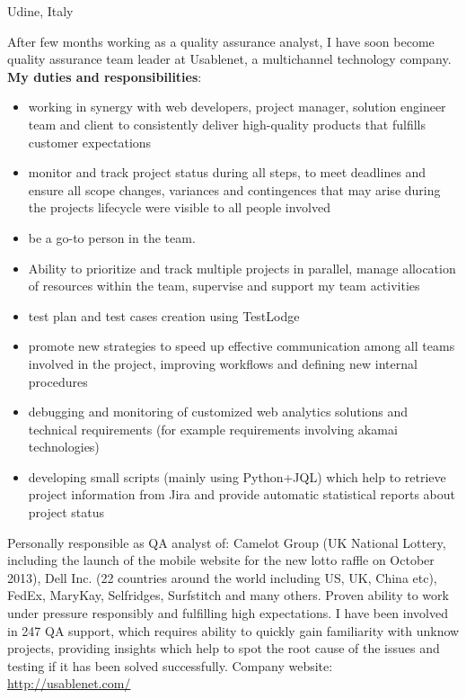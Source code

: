 \documentclass[10pt,a4paper]{moderncv}   %
\begin{document}
   {Udine, Italy}{}{After few months working as a quality assurance analyst, I
      have soon become
   quality assurance team leader at Usablenet, a multichannel technology
   company. 
   \\
   \textbf{My duties and responsibilities}:
   \begin{itemize}
\item 
  working in synergy with  web
   developers, project manager, solution engineer team and client to
   consistently deliver high-quality
   products that fulfills customer expectations 
\item monitor and track project status during all steps, to meet deadlines
   and ensure all scope changes,
 variances and contingences that may arise during the 
 projects lifecycle were visible to all people involved
 \item  be a go-to person in the team.
 \item 
   Ability to prioritize and track multiple projects in parallel,
    manage  allocation of resources within the team, supervise and support my team
    activities
\item test plan and test cases creation using TestLodge
\item promote new strategies to speed up effective communication among all
   teams involved in the project,
   improving workflows and defining new internal procedures
\item debugging and monitoring of customized web analytics solutions and 
technical requirements (for example requirements involving
   akamai technologies)
   \item developing small scripts (mainly using Python+JQL) which help to retrieve project
 information from Jira and provide automatic statistical reports about project status
 \end{itemize} 
   Personally responsible as QA analyst of:
   Camelot Group (UK National Lottery, including the
   launch of the mobile website for the new lotto raffle on October 2013), Dell Inc. (22 countries
   around the world including US, UK, China etc), FedEx,
   MaryKay, Selfridges, Surfstitch and many others.
   Proven ability to work under pressure responsibly and fulfilling high
   expectations.
I have been involved in 247 QA support, which requires ability to quickly gain
familiarity with unknow projects, providing insights which help to spot the root
cause of the issues and testing if it has
been solved successfully.
Company website: \url{http://usablenet.com/}}
\end{document}

